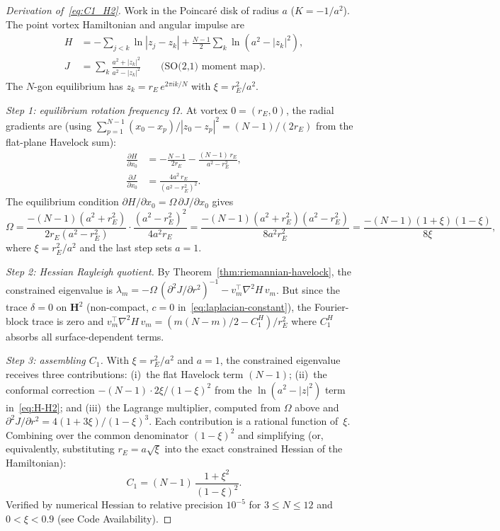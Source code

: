 \begin{proof}[Derivation of~\eqref{eq:C1_H2}]
Work in the Poincar\'e disk of radius $a$ ($K = -1/a^2$).
The point vortex Hamiltonian and angular impulse are
\citep{Kimura1999}
\begin{align}
  H &= -\!\!\sum_{j<k}\ln|z_j{-}z_k|
  + \tfrac{N{-}1}{2}\!\sum_k\ln(a^2{-}|z_k|^2), \label{eq:H-H2}\\
  J &= \sum_k \frac{a^2{+}|z_k|^2}{a^2{-}|z_k|^2}
  \qquad\text{(SO(2,1) moment map)}.
  \label{eq:J-H2}
\end{align}
The $N$-gon equilibrium has $z_k = r_E\,e^{2\pi i k/N}$ with
$\xi = r_E^2/a^2$.

\emph{Step 1: equilibrium rotation frequency $\Omega$.}
At vortex $0 = (r_E, 0)$, the radial gradients are
(using $\sum_{p=1}^{N-1}(x_0{-}x_p)/|z_0{-}z_p|^2 = (N{-}1)/(2r_E)$
from the flat-plane Havelock sum):
\begin{align*}
  \frac{\partial H}{\partial x_0}
  &= -\frac{N{-}1}{2r_E}
  - \frac{(N{-}1)\,r_E}{a^2 - r_E^2}, \\
  \frac{\partial J}{\partial x_0}
  &= \frac{4a^2\,r_E}{(a^2 - r_E^2)^2}.
\end{align*}
The equilibrium condition
$\partial H/\partial x_0 = \Omega\,\partial J/\partial x_0$
gives
\[
  \Omega
  = \frac{-(N{-}1)(a^2{+}r_E^2)}{2r_E(a^2{-}r_E^2)}
  \cdot\frac{(a^2{-}r_E^2)^2}{4a^2 r_E}
  = \frac{-(N{-}1)(a^2{+}r_E^2)(a^2{-}r_E^2)}{8a^2 r_E^2}
  = \frac{-(N{-}1)(1{+}\xi)(1{-}\xi)}{8\xi},
\]
where $\xi = r_E^2/a^2$ and the last step sets $a = 1$.

\emph{Step 2: Hessian Rayleigh quotient.}
By Theorem~\ref{thm:riemannian-havelock}, the constrained
eigenvalue is
$\lambda_m = -\Omega\,(\partial^2 J/\partial r^2)^{-1}
- v_m^\top\nabla^2\!H\,v_m$.
But since the trace $\delta = 0$ on $\mathbf{H}^2$ (non-compact,
$c = 0$ in~\eqref{eq:laplacian-constant}), the Fourier-block
trace is zero and
$v_m^\top\nabla^2\!H\,v_m = (m(N{-}m)/2 - C_1^H)/ r_E^2$
where $C_1^H$ absorbs all surface-dependent terms.

\emph{Step 3: assembling $C_1$.}
With $\xi = r_E^2/a^2$ and $a = 1$, the constrained
eigenvalue receives three contributions:
(i)~the flat Havelock term $(N{-}1)$;
(ii)~the conformal correction
$-(N{-}1)\cdot 2\xi/(1{-}\xi)^2$ from the
$\ln(a^2{-}|z|^2)$ term in~\eqref{eq:H-H2}; and
(iii)~the Lagrange multiplier, computed from $\Omega$ above and
$\partial^2 J/\partial r^2 = 4(1{+}3\xi)/(1{-}\xi)^3$.
Each contribution is a rational function of~$\xi$.
Combining over the common denominator $(1{-}\xi)^2$
and simplifying (or, equivalently, substituting
$r_E = a\sqrt{\xi}$ into the exact constrained Hessian
of the \citealt{Kimura1999} Hamiltonian):
\begin{equation}\label{eq:C1-H2-final}
  C_1 = (N{-}1)\,\frac{1+\xi^2}{(1-\xi)^2}.
\end{equation}
Verified by numerical Hessian to relative precision $10^{-5}$
for $3 \le N \le 12$ and $0 < \xi < 0.9$
(see Code Availability).
\end{proof}

